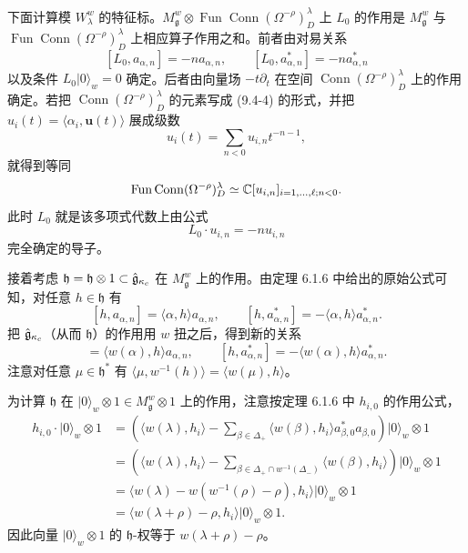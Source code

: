 下面计算模 $W^w_\lambda$ 的特征标。$M^w_{\mathfrak{g}}\otimes\operatorname{Fun}\operatorname{Conn}(\Omega^{-\rho})^\lambda_D$ 上 $L_0$ 的作用是 $M^w_{\mathfrak{g}}$ 与 $\operatorname{Fun}\operatorname{Conn}(\Omega^{-\rho})^\lambda_D$ 上相应算子作用之和。前者由对易关系
\[
    [L_0,a_{\alpha,n}]=-na_{\alpha,n},\qquad
    [L_0,a^*_{\alpha,n}]=-na^*_{\alpha,n}
\]
以及条件 $L_0|0\rangle_w=0$ 确定。后者由向量场 $-t\partial_t$ 在空间 $\operatorname{Conn}(\Omega^{-\rho})^\lambda_D$ 上的作用确定。若把 $\operatorname{Conn}(\Omega^{-\rho})^\lambda_D$ 的元素写成 (9.4-4) 的形式，并把 $u_i(t)=\langle\alpha_i,\mathbf{u}(t)\rangle$ 展成级数
\[
    u_i(t)=\sum_{n<0}u_{i,n}t^{-n-1},
\]
就得到等同
\[
    \operatorname{Fun}\operatorname{Conn}(\Omega^{-\rho})^\lambda_D\simeq\mathbb{C}[u_{i,n}]_{i=1,\dots,\ell;n<0}.
\]
此时 $L_0$ 就是该多项式代数上由公式
\[
    L_0\cdot u_{i,n}=-nu_{i,n}
\]
完全确定的导子。

接着考虑 $\mathfrak{h}=\mathfrak{h}\otimes1\subset\hat{\mathfrak{g}}_{\kappa_c}$ 在 $M^w_{\mathfrak{g}}$ 上的作用。由定理 6.1.6 中给出的原始公式可知，对任意 $h\in\mathfrak{h}$ 有
\[
    [h,a_{\alpha,n}]=\langle\alpha,h\rangle a_{\alpha,n},\qquad
    [h,a^*_{\alpha,n}]=-\langle\alpha,h\rangle a^*_{\alpha,n}.
\]
把 $\hat{\mathfrak{g}}_{\kappa_c}$（从而 $\mathfrak{h}$）的作用用 $w$ 扭之后，得到新的关系
\begin{equation}
    [h,a_{\alpha,n}]=\langle w(\alpha),h\rangle a_{\alpha,n},\qquad
    [h,a^*_{\alpha,n}]=-\langle w(\alpha),h\rangle a^*_{\alpha,n}.
    \tag{9.5-3}
\end{equation}
注意对任意 $\mu\in\mathfrak{h}^*$ 有 $\langle\mu,w^{-1}(h)\rangle=\langle w(\mu),h\rangle$。

为计算 $\mathfrak{h}$ 在 $|0\rangle_w\otimes1\in M^w_{\mathfrak{g}}\otimes1$ 上的作用，注意按定理 6.1.6 中 $h_{i,0}$ 的作用公式，
\begin{align*}
    h_{i,0}\cdot|0\rangle_w\otimes1
    &=\left(\langle w(\lambda),h_i\rangle-\sum_{\beta\in\Delta_+}\langle w(\beta),h_i\rangle a^*_{\beta,0}a_{\beta,0}\right)|0\rangle_w\otimes1\\
    &=\left(\langle w(\lambda),h_i\rangle-\sum_{\beta\in\Delta_+\cap w^{-1}(\Delta_-)}\langle w(\beta),h_i\rangle\right)|0\rangle_w\otimes1\\
    &=\langle w(\lambda)-w(w^{-1}(\rho)-\rho),h_i\rangle|0\rangle_w\otimes1\\
    &=\langle w(\lambda+\rho)-\rho,h_i\rangle|0\rangle_w\otimes1.
\end{align*}
因此向量 $|0\rangle_w\otimes1$ 的 $\mathfrak{h}$-权等于 $w(\lambda+\rho)-\rho$。

